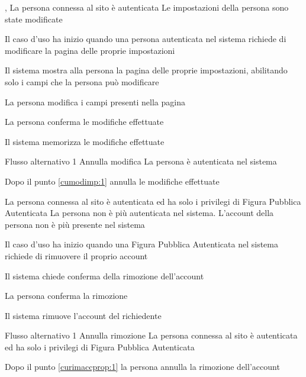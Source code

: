 {, }
{La persona connessa al sito è autenticata}
{Le impostazioni della persona sono state modificate}
{\begin{enumCU}
	\item Il caso d'uso ha inizio quando una persona autenticata nel sistema richiede di modificare la pagina delle proprie impostazioni
	\item Il sistema mostra alla persona la pagina delle proprie impostazioni, abilitando solo i campi che la persona può modificare
	\item La persona modifica i campi presenti nella pagina\label{cumodimp:1}
	\item La persona conferma le modifiche effettuate 
	\item Il sistema memorizza le modifiche effettuate
\end{enumCU}}
%
{Flusso alternativo 1}%
{Annulla modifica}%
{La persona è autenticata nel sistema}%
{\postNulle}%
{\begin{enumCU}
		\item Dopo il punto \ref{cumodimp:1} annulla le modifiche effettuate
	\end{enumCU}}%

\tabcuvspace

{}
{La persona connessa al sito è autenticata ed ha solo i privilegi di Figura Pubblica Autenticata}
{La persona non è più autenticata nel sistema. L'account della persona non è più presente nel sistema}
{\begin{enumCU}
	\item Il caso d'uso ha inizio quando una Figura Pubblica Autenticata nel sistema richiede di rimuovere il proprio account
	\item Il sistema chiede conferma della rimozione dell'account\label{curimaccprop:1}
	\item La persona conferma la rimozione
	\item Il sistema rimuove l'account del richiedente
\end{enumCU}}
%
{Flusso alternativo 1}%
{Annulla rimozione}%
{La persona connessa al sito è autenticata ed ha solo i privilegi di Figura Pubblica Autenticata}%
{\postNulle}%
{\begin{enumCU}
		\item Dopo il punto \ref{curimaccprop:1} la persona annulla la rimozione dell'account
	\end{enumCU}}%

